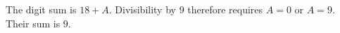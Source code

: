 The digit sum is $18+A$. Divisibility by $9$ therefore requires $A=0$ or $A=9$. Their sum is $\boxed9$.
